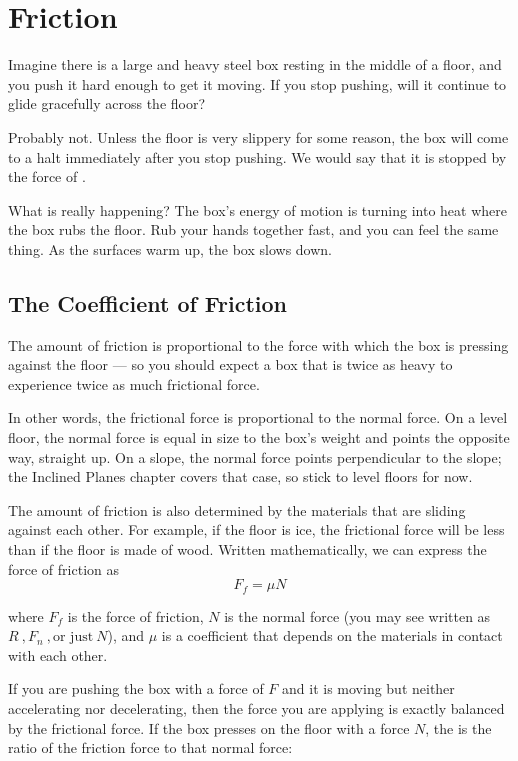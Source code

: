 \chapter{Friction}

Imagine there is a large and heavy steel box resting in the middle of a floor, and you push it hard enough to get it moving. If you stop pushing, will it continue to glide gracefully across the floor? 

Probably not. Unless the floor is very slippery for some reason, the box will come to a halt immediately after you stop pushing. We would say that it is stopped by the force of .

What is really happening? The box's energy of motion is turning into heat where the box rubs the floor. Rub your hands together fast, and you can feel the same thing. As the surfaces warm up, the box slows down.

\section{The Coefficient of Friction}
The amount of friction is proportional to the force with which the box is pressing against the floor --- so you should expect a box that is twice as heavy to experience twice as much frictional force.

In other words, the frictional force is proportional to the normal force. On a level floor, the normal force is equal in size to the box's weight and points the opposite way, straight up. On a slope, the normal force points perpendicular to the slope; the Inclined Planes chapter covers that case, so stick to level floors for now. 


The amount of friction is also determined by the materials that are sliding against each other. For example, if the floor is ice, the frictional force will be less than if the floor is made of wood. Written mathematically, we can express the force of friction as
$$F_{f} = \mu N$$

where $F_{f}$ is the force of friction, $N$ is the normal force (you may see written as $R \ , F_{n} \ , \text{or just} \ N$), and $\mu$ is a coefficient that depends on the materials in contact with each other.

If you are pushing the box with a force of $F$ and it is moving but neither accelerating nor decelerating, then the force you are applying is exactly balanced by the frictional force. If the box presses on the floor with a force $N$, the  is the ratio of the friction force to that normal force:

